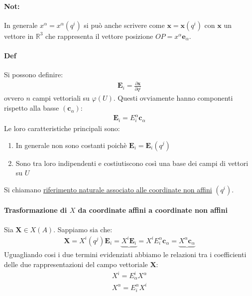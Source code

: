 \paragraph{Not:}In generale $x^\alpha=x^\alpha(q^i)$ si può anche scrivere come $\textbf{x}=\mathbf{x}(q^i)$ con $\mathbf{x}$ un vettore in $\mathbb{R}^3$ che rappresenta il vettore posizione $OP=x^\alpha \mathbf{e}_\alpha$.
\paragraph{Def} Si possono definire:
\begin{align*}
    \mathbf{E}_i=\frac{\partial \mathbf{x}}{\partial q^i}
\end{align*}
ovvero $n$ campi vettoriali su $\varphi(U)$. Questi ovviamente hanno componenti rispetto alla basse $(\mathbf{c}_\alpha)$:
\begin{align*}
    \mathbf{E}_i=E^\alpha_i\mathbf{c}_\alpha
\end{align*}
Le loro caratteristiche principali sono:
\begin{enumerate}
   \item In generale non sono costanti poichè $\mathbf{E}_i=\mathbf{E}_i(q^j)$
   \item Sono tra loro indipendenti e costiutiscono così una base dei campi di vettori su $U$
\end{enumerate}
Si chiamano \underline{riferimento naturale associato alle coordinate non affini} $(q^i)$.
\paragraph*{Trasformazione di $X$ da coordinate affini a coordinate non affini} Sia $\mathbf{X}\in X(A)$. Sappiamo sia che:
\begin{align*}
    \mathbf{X}=X^i(q^j)\mathbf{E}_i=\underbrace{X^i\mathbf{E}_i}=X^iE^\alpha_i\mathbf{c}_\alpha=\underbrace{X^\alpha\mathbf{c}_\alpha}
\end{align*}
Uguagliando cosi i due termini evidenziati abbiamo le relazioni tra i coefficienti delle due rappresentazioni del campo vettoriale $\mathbf{X}$:
\begin{align*}
    X^i=E^i_\alpha X^\alpha\\
    X^\alpha=E^\alpha_iX^i
\end{align*}
